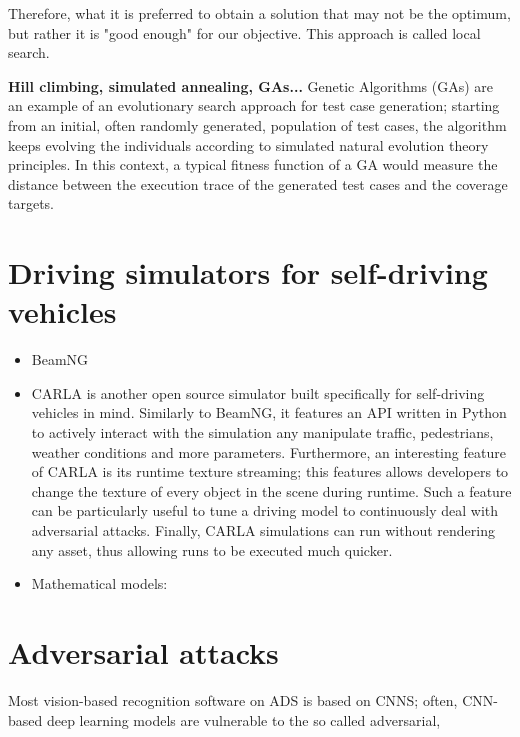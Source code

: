 Therefore, what it is preferred to obtain a solution that may not be the optimum, but rather it is "good enough" for our objective. This approach is called local search.

 
\textbf{Hill climbing, simulated annealing, GAs...}
Genetic Algorithms (GAs) are an example of an
evolutionary search approach for test case generation; starting from an initial, often randomly generated, population of 
test cases, the algorithm keeps evolving the individuals according to simulated natural evolution theory principles.
In this context, a typical fitness function of a GA would measure the distance between the execution trace of the generated test cases
and the coverage targets.





\newpage
\section{Driving simulators for self-driving vehicles}

\begin{itemize}
    \item BeamNG
    \item CARLA \cite{Dosovitskiy17} is another open source simulator built specifically for self-driving vehicles in mind. Similarly to BeamNG, it features an API written in Python to actively interact with the simulation any manipulate traffic, pedestrians, weather conditions and more parameters.
    Furthermore, an interesting feature of CARLA is its runtime texture streaming; this features allows developers to change the texture of every object in the scene during runtime. Such a feature can be particularly useful to tune a driving model to continuously deal with adversarial attacks.
    Finally, CARLA simulations can run without rendering any asset, thus allowing runs to be executed much quicker.
    \item Mathematical models: 

\end{itemize}


\newpage
\section{Adversarial attacks}

Most vision-based recognition software on ADS is based on CNNS; often, CNN-based deep learning models are vulnerable to the so called adversarial, 

